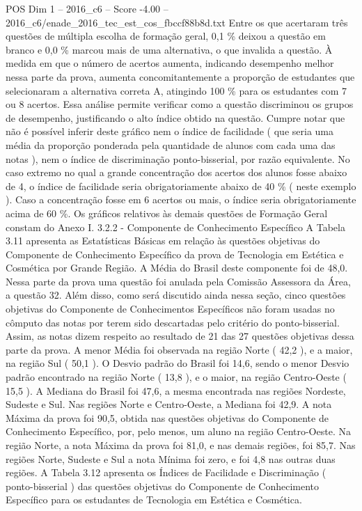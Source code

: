 \begin{textsample}{POS Dim 1 – 2016\_c6 – Score -4.00 – 2016\_c6/enade\_2016\_tec\_est\_cos\_fbccf88b8d.txt}
Entre os que acertaram três questões de múltipla escolha de formação geral, 0,1 \% deixou a questão em branco e 0,0 \% marcou mais de uma alternativa, o que invalida a questão.
À medida em que o número de acertos aumenta, indicando desempenho melhor nessa parte da prova, aumenta concomitantemente a proporção de estudantes que selecionaram a alternativa correta A, atingindo 100 \% para os estudantes com 7 ou 8 acertos.
Essa análise permite verificar como a questão discriminou os grupos de desempenho, justificando o alto índice obtido na questão.
Cumpre notar que não é possível inferir deste gráfico nem o índice de facilidade ( que seria uma média da proporção ponderada pela quantidade de alunos com cada uma das notas ), nem o índice de discriminação ponto-bisserial, por razão equivalente.
No caso extremo no qual a grande concentração dos acertos dos alunos fosse abaixo de 4, o índice de facilidade seria obrigatoriamente abaixo de 40 \% ( neste exemplo ).
Caso a concentração fosse em 6 acertos ou mais, o índice seria obrigatoriamente acima de 60 \%.
Os gráficos relativos às demais questões de Formação Geral constam do Anexo I. 3.2.2 - Componente de Conhecimento Específico A Tabela 3.11 apresenta as Estatísticas Básicas em relação às questões objetivas do Componente de Conhecimento Específico da prova de Tecnologia em Estética e Cosmética por Grande Região.
A Média do Brasil deste componente foi de 48,0.
Nessa parte da prova uma questão foi anulada pela Comissão Assessora da Área, a questão 32.
Além disso, como será discutido ainda nessa seção, cinco questões objetivas do Componente de Conhecimentos Específicos não foram usadas no cômputo das notas por terem sido descartadas pelo critério do ponto-bisserial.
Assim, as notas dizem respeito ao resultado de 21 das 27 questões objetivas dessa parte da prova.
A menor Média foi observada na região Norte ( 42,2 ), e a maior, na região Sul ( 50,1 ).
O Desvio padrão do Brasil foi 14,6, sendo o menor Desvio padrão encontrado na região Norte ( 13,8 ), e o maior, na região Centro-Oeste ( 15,5 ).
A Mediana do Brasil foi 47,6, a mesma encontrada nas regiões Nordeste, Sudeste e Sul.
Nas regiões Norte e Centro-Oeste, a Mediana foi 42,9.
A nota Máxima da prova foi 90,5, obtida nas questões objetivas do Componente de Conhecimento Específico, por, pelo menos, um aluno na região Centro-Oeste.
Na região Norte, a nota Máxima da prova foi 81,0, e nas demais regiões, foi 85,7.
Nas regiões Norte, Sudeste e Sul a nota Mínima foi zero, e foi 4,8 nas outras duas regiões.
A Tabela 3.12 apresenta os Índices de Facilidade e Discriminação ( ponto-bisserial ) das questões objetivas do Componente de Conhecimento Específico para os estudantes de Tecnologia em Estética e Cosmética.

\end{textsample}
